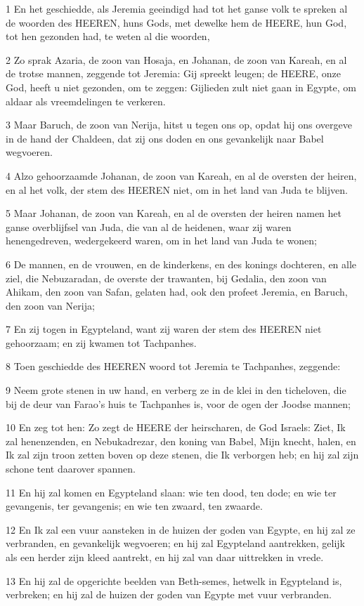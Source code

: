\par 1 En het geschiedde, als Jeremia geeindigd had tot het ganse volk te spreken al de woorden des HEEREN, huns Gods, met dewelke hem de HEERE, hun God, tot hen gezonden had, te weten al die woorden,
\par 2 Zo sprak Azaria, de zoon van Hosaja, en Johanan, de zoon van Kareah, en al de trotse mannen, zeggende tot Jeremia: Gij spreekt leugen; de HEERE, onze God, heeft u niet gezonden, om te zeggen: Gijlieden zult niet gaan in Egypte, om aldaar als vreemdelingen te verkeren.
\par 3 Maar Baruch, de zoon van Nerija, hitst u tegen ons op, opdat hij ons overgeve in de hand der Chaldeen, dat zij ons doden en ons gevankelijk naar Babel wegvoeren.
\par 4 Alzo gehoorzaamde Johanan, de zoon van Kareah, en al de oversten der heiren, en al het volk, der stem des HEEREN niet, om in het land van Juda te blijven.
\par 5 Maar Johanan, de zoon van Kareah, en al de oversten der heiren namen het ganse overblijfsel van Juda, die van al de heidenen, waar zij waren henengedreven, wedergekeerd waren, om in het land van Juda te wonen;
\par 6 De mannen, en de vrouwen, en de kinderkens, en des konings dochteren, en alle ziel, die Nebuzaradan, de overste der trawanten, bij Gedalia, den zoon van Ahikam, den zoon van Safan, gelaten had, ook den profeet Jeremia, en Baruch, den zoon van Nerija;
\par 7 En zij togen in Egypteland, want zij waren der stem des HEEREN niet gehoorzaam; en zij kwamen tot Tachpanhes.
\par 8 Toen geschiedde des HEEREN woord tot Jeremia te Tachpanhes, zeggende:
\par 9 Neem grote stenen in uw hand, en verberg ze in de klei in den ticheloven, die bij de deur van Farao's huis te Tachpanhes is, voor de ogen der Joodse mannen;
\par 10 En zeg tot hen: Zo zegt de HEERE der heirscharen, de God Israels: Ziet, Ik zal henenzenden, en Nebukadrezar, den koning van Babel, Mijn knecht, halen, en Ik zal zijn troon zetten boven op deze stenen, die Ik verborgen heb; en hij zal zijn schone tent daarover spannen.
\par 11 En hij zal komen en Egypteland slaan: wie ten dood, ten dode; en wie ter gevangenis, ter gevangenis; en wie ten zwaard, ten zwaarde.
\par 12 En Ik zal een vuur aansteken in de huizen der goden van Egypte, en hij zal ze verbranden, en gevankelijk wegvoeren; en hij zal Egypteland aantrekken, gelijk als een herder zijn kleed aantrekt, en hij zal van daar uittrekken in vrede.
\par 13 En hij zal de opgerichte beelden van Beth-semes, hetwelk in Egypteland is, verbreken; en hij zal de huizen der goden van Egypte met vuur verbranden.

